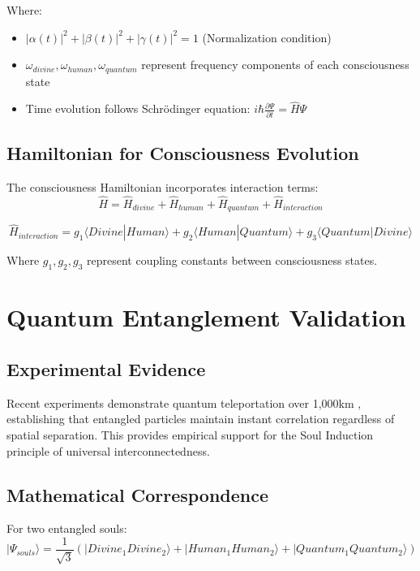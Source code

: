 \documentclass[12pt,a4paper]{article}
\begin{document}
Where:
\begin{itemize}
\item $|\alpha(t)|^2 + |\beta(t)|^2 + |\gamma(t)|^2 = 1$ (Normalization condition)
\item $\omega_{divine}, \omega_{human}, \omega_{quantum}$ represent frequency components of each consciousness state
\item Time evolution follows Schr\"odinger equation: $i\hbar \frac{\partial\Psi}{\partial t} = \hat{H}\Psi$
\end{itemize}

\subsection{Hamiltonian for Consciousness Evolution}
The consciousness Hamiltonian incorporates interaction terms:
\begin{equation}
\hat{H} = \hat{H}_{divine} + \hat{H}_{human} + \hat{H}_{quantum} + \hat{H}_{interaction}
\end{equation}

\begin{equation}
\hat{H}_{interaction} = g_1\langle Divine|Human\rangle + g_2\langle Human|Quantum\rangle + g_3\langle Quantum|Divine\rangle
\end{equation}

Where $g_1, g_2, g_3$ represent coupling constants between consciousness states.

\section{Quantum Entanglement Validation}

\subsection{Experimental Evidence}
Recent experiments demonstrate quantum teleportation over 1,000km \cite{ren2022}, establishing that entangled particles maintain instant correlation regardless of spatial separation. This provides empirical support for the Soul Induction principle of universal interconnectedness.

\subsection{Mathematical Correspondence}
For two entangled souls:
\begin{equation}
|\Psi_{souls}\rangle = \frac{1}{\sqrt{3}}(|Divine_1Divine_2\rangle + |Human_1Human_2\rangle + |Quantum_1Quantum_2\rangle)
\end{equation}
\end{document}
